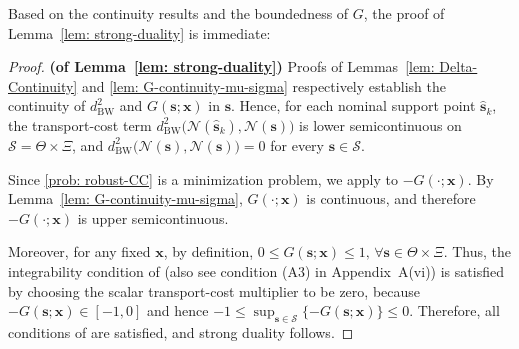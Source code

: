 \documentclass[opre,sglanonrev]{informs4}
\newcommand{\mS}{\mathcal{S}}
\newcommand{\mN}{\mathcal{N}}
\newcommand{\bs}{\bm{s}}
\newcommand{\bx}{\bm{x}}
\begin{document}
{Based on the continuity results and the boundedness of \(G\), the proof of Lemma~\ref{lem: strong-duality} is immediate:

\begin{proof}
 \textbf{(of Lemma~\ref{lem: strong-duality})}
 Proofs of Lemmas~\ref{lem: Delta-Continuity} and
 \ref{lem: G-continuity-mu-sigma} respectively establish the continuity of
 \(d^2_{\mathrm{BW}}\) and \(G(\bs;\bx)\) in \(\bs\). Hence, for each nominal
 support point \(\hat{\bs}_k\), the transport-cost term $d^2_{\mathrm{BW}}\bigl(\mN(\hat{\bs}_k),\mN(\bs)\bigr)$
 is lower semicontinuous on $\mS = \Theta \times \Xi$, and \(d^2_{\mathrm{BW}}\bigl(\mN(\bs),\mN(\bs)\bigr)=0\) for every
\(\bs\in\mS\).

 Since \eqref{prob: robust-CC} is a minimization problem, we apply
 \cite[Theorem~1(a)]{blanchet2019quantifying} to \(-G(\cdot;\bx)\). By
 Lemma~\ref{lem: G-continuity-mu-sigma}, \(G(\cdot;\bx)\) is continuous, and
 therefore \(-G(\cdot;\bx)\) is upper semicontinuous.

 Moreover, for any fixed \(\bx\), by definition, $ 0\le G(\bs;\bx)\le 1,
 \, \forall \bs\in\Theta\times\Xi.$
 Thus, the integrability condition of
 \cite[Theorem~1(a)]{blanchet2019quantifying} (also see condition (A3) in
 Appendix~A(vi)) is satisfied by choosing the scalar transport-cost multiplier to be zero, because \(-G(\bs;\bx)\in[-1,0]\) and hence $ -1
 \le
 \sup_{\bs\in\mS}\{-G(\bs;\bx)\}
 \le
 0.$  Therefore, all conditions of \cite[Theorem~1(a)]{blanchet2019quantifying} are satisfied, and strong duality follows.
\end{proof}


}
\end{document}
